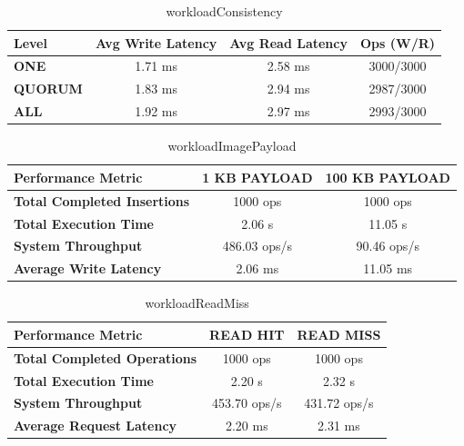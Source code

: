 \documentclass[12pt]{article}
\begin{document}
\begin{table}[H]
\centering
\begin{tabular}{|l|c|c|c|}
\hline
\textbf{Level} & \textbf{Avg Write Latency} & \textbf{Avg Read Latency} & \textbf{Ops (W/R)} \\
\hline
\textbf{ONE}    & 1.71 ms & 2.58 ms & 3000/3000 \\
\hline
\textbf{QUORUM} & 1.83 ms & 2.94 ms & 2987/3000 \\
\hline
\textbf{ALL}    & 1.92 ms & 2.97 ms & 2993/3000 \\
\hline
\end{tabular}
\caption{workloadConsistency}
\label{t_consistency}
\end{table}

\begin{table}[H]
\centering
\begin{tabular}{|l|c|c|}
\hline
\textbf{Performance Metric} & \textbf{1 KB PAYLOAD} & \textbf{100 KB PAYLOAD} \\
\hline
\textbf{Total Completed Insertions} & 1000 ops & 1000 ops \\
\hline
\textbf{Total Execution Time} & 2.06 s & 11.05 s \\
\hline
\textbf{System Throughput} & 486.03 ops/s & 90.46 ops/s \\
\hline
\textbf{Average Write Latency} & 2.06 ms & 11.05 ms \\
\hline
\end{tabular}
\caption{workloadImagePayload}
\label{t_imagePayload}
\end{table}

\begin{table}[H]
\centering
\begin{tabular}{|l|c|c|}
\hline
\textbf{Performance Metric} & \textbf{READ HIT} & \textbf{READ MISS} \\
\hline
\textbf{Total Completed Operations} & 1000 ops & 1000 ops \\
\hline
\textbf{Total Execution Time} & 2.20 s & 2.32 s \\
\hline
\textbf{System Throughput} & 453.70 ops/s & 431.72 ops/s \\
\hline
\textbf{Average Request Latency} & 2.20 ms & 2.31 ms \\
\hline
\end{tabular}
\caption{workloadReadMiss}
\label{t_readMiss}
\end{table}
\end{document}
